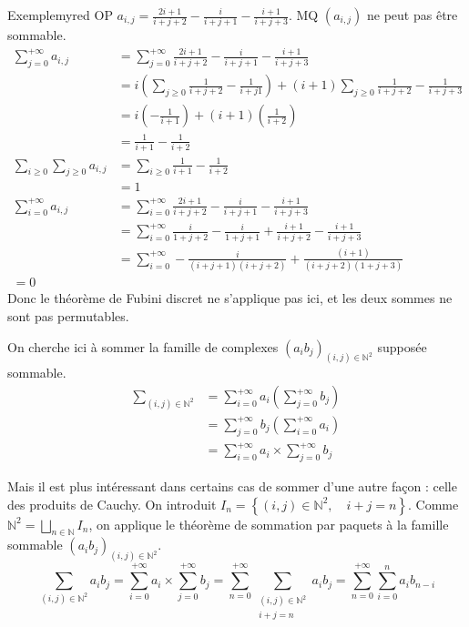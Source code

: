     \begin{omed}{Exemple}{myred}
        OP $a_{i,j} = \frac{2i+1}{i+j+2} - \frac{i}{i + j + 1} - \frac{i + 1}{i + j + 3}$. MQ $(a_{i,j})$ ne peut pas être sommable.
        \begin{align*}
            \sum_{j = 0}^{+\infty} a_{i,j} 
            &= \sum_{j = 0}^{+\infty} \frac{2i+1}{i+j+2} - \frac{i}{i + j + 1} - \frac{i + 1}{i + j + 3} \\
            &= i\left(\sum_{j \geq 0} \frac{1}{i + j + 2} - \frac{1}{i + j 1}\right) + (i+1) \sum_{j \geq 0} \frac{1}{i + j + 2} - \frac{1}{i + j + 3} \\
            &= i\left(-\frac{1}{i + 1}\right) + (i+1) \left(\frac{1}{i + 2}\right) \\
            &= \frac{1}{i + 1} - \frac{1}{i + 2} \\
            \sum_{i \geq 0} \sum_{j \geq 0} a_{i,j} &= \sum_{i \geq 0} \frac{1}{i + 1} - \frac{1}{i + 2} \\
            &= 1 \\
            \sum_{i = 0}^{+\infty} a_{i,j} &= \sum_{i = 0}^{+\infty} \frac{2i + 1}{i + j + 2} - \frac{i}{i + j + 1} - \frac{i + 1}{i + j + 3} \\
            &= \sum_{i = 0}^{+\infty} \frac{i}{1 + j + 2} - \frac{i}{1 + j + 1} + \frac{i+ 1}{i + j + 2} - \frac{i + 1}{i + j + 3} \\
            &= \sum_{i = 0}^{+\infty} -\frac{i}{(i + j + 1)(i + j + 2)} + \frac{(i+ 1)}{(i + j + 2)(1 + j + 3)} \\
            = 0 
        \end{align*}
        Donc le théorème de Fubini discret ne s’applique pas ici, et les deux sommes ne sont pas permutables.
    \end{omed}

    On cherche ici à sommer la famille de complexes $(a_i b_j)_{(i,j) \in \mathbb{N}^2}$ supposée sommable. 
    \begin{align*}
        \sum_{(i,j) \in \mathbb{N}^2} &= \sum_{i = 0}^{+\infty} a_i \left(\sum_{j = 0}^{+\infty} b_j\right) \\
        &= \sum_{j=0}^{+\infty} b_j \left(\sum_{i =0}^{+\infty} a_i\right) \\
        &= \sum_{i = 0}^{+\infty} a_i \times \sum_{j=0}^{+\infty} b_j
    \end{align*}

    Mais il est plus intéressant dans certains cas de sommer d’une autre façon : celle des produits de Cauchy. On introduit $I_n = \left\{(i,j) \in \mathbb{N}^2, \quad i+j = n\right\}$. Comme $\mathbb{N}^2 = \bigsqcup_{n \in \mathbb{N}} I_n$, on applique le théorème de sommation par paquets à la famille sommable $(a_i b_j)_{(i,j) \in \mathbb{N}^2}$. 
    \[ \sum_{(i,j) \in \mathbb{N}^2} a_i b_j = \sum_{i = 0}^{+\infty} a_i \times \sum_{j= 0}^{+\infty} b_j = \sum_{n = 0}^{+\infty} \sum_{\substack{(i,j) \in \mathbb{N}^2 \\ i+ j = n}} a_i b_j = \sum_{n = 0}^{+\infty} \sum_{i = 0}^n a_i b_{n-i} \]

